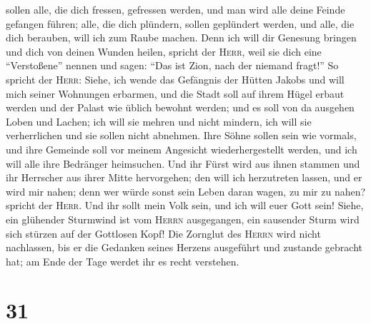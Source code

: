 sollen alle, die dich fressen, gefressen werden, und man wird alle deine
Feinde gefangen führen; alle, die dich plündern, sollen geplündert
werden, und alle, die dich berauben, will ich zum Raube machen.
 Denn ich will dir Genesung bringen und dich von deinen
Wunden heilen, spricht der \textsc{Herr}, weil sie dich eine
``Verstoßene'' nennen und sagen: ``Das ist Zion, nach der niemand
fragt!''  So spricht der \textsc{Herr}: Siehe, ich wende
das Gefängnis der Hütten Jakobs und will mich seiner Wohnungen erbarmen,
und die Stadt soll auf ihrem Hügel erbaut werden und der Palast wie
üblich bewohnt werden;  und es soll von da ausgehen Loben
und Lachen; ich will sie mehren und nicht mindern, ich will sie
verherrlichen und sie sollen nicht abnehmen.  Ihre Söhne
sollen sein wie vormals, und ihre Gemeinde soll vor meinem Angesicht
wiederhergestellt werden, und ich will alle ihre Bedränger heimsuchen.
 Und ihr Fürst wird aus ihnen stammen und ihr Herrscher
aus ihrer Mitte hervorgehen; den will ich herzutreten lassen, und er
wird mir nahen; denn wer würde sonst sein Leben daran wagen, zu mir zu
nahen? spricht der \textsc{Herr}.  Und ihr sollt mein
Volk sein, und ich will euer Gott sein!  Siehe, ein
glühender Sturmwind ist vom \textsc{Herrn} ausgegangen, ein sausender
Sturm wird sich stürzen auf der Gottlosen Kopf!  Die
Zornglut des \textsc{Herrn} wird nicht nachlassen, bis er die Gedanken
seines Herzens ausgeführt und zustande gebracht hat; am Ende der Tage
werdet ihr es recht verstehen.

\hypertarget{section-30}{%
\section{31}\label{section-30}}

